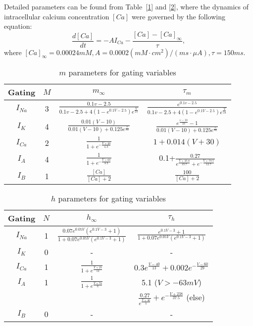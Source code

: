 \documentclass[12pt, a4paper]{article}%
\begin{document}
Detailed parameters can be found from Table~[\ref{tab:gating1}] and [\ref{tab:gating2}], where the dynamics of intracellular calcium concentration $[Ca]$ were governed by the following equation:
$$\frac{d[Ca]}{dt} = -AI_{Ca} - \frac{[Ca]-[Ca]_{\infty}}{\tau},$$
where $[Ca]_{\infty} = 0.00024 mM , A = 0.0002 (mM \cdot cm^{2}) /(ms \cdot \mu A), \tau = 150 ms.$

\begin{table}[htop]
\centering
\caption[gating]{$m$ parameters for gating variables} \label{tab:gating1}
\begin{tabular}{c|c|c|c}
\hline
Gating   & $M$ & $m_{\infty}$                      & $\tau_{m}$           \\\hline
$I_{Na}$  & 3 & $\frac{0.1v-2.5}{0.1v-2.5+4(1-e^{0.1V-2.5})e^{\frac{V}{18}}}$ & $\frac{e^{0.1v-2.5}}{0.1v-2.5+4(1-e^{0.1V-2.5})e^{\frac{V}{18}}}$ \\
$I_{K}$   & 4 & $\frac{0.01(V-10)}{0.01(V-10)+0.125e^{\frac{v}{80}}}$ & $\frac{e^{\frac{v-10}{10}}-1}{0.01(V-10)+0.125e^{\frac{v}{80}}}$ \\
$I_{Ca}$  & 2 & $\frac{1}{1+e^{-\frac{V+20}{6.5}}}$ & $1+0.014(V+30)$        \\  %
$I_{A}$   & 4 & $\frac{1}{1+e^{-\frac{V+60}{8.5}}}$ & 0.1+$\frac{0.27}{ e^{\frac{V + 35.8}{19.7}} + e^{-\frac{V + 79.7}{12.7}}}$ \\
$I_{B}$  &  1 &  $\frac{[Ca]}{[Ca]+2}$           & $\frac{100}{[Ca]+2}$  \\\hline
\end{tabular}
\end{table}

\begin{table}[htop]
\centering
\caption[gating]{$h$ parameters for gating variables} \label{tab:gating2}
\begin{tabular}{c|c|c|c}
\hline
Gating   & $N$ & $h_{\infty}$                   & $\tau_{h}$ \\\hline
$I_{Na}$  & 1 & $\frac{0.07e^{0.05V}(e^{0.1V-3}+1)}{1+0.07e^{0.05V}(e^{0.1V-3}+1)}$ & $\frac{e^{0.1V-3}+1}{1+0.07e^{0.05V}(e^{0.1V-3}+1)}$ \\
$I_{K}$   & 0 &  -                            & - \\
$I_{Ca}$  & 1 &  $\frac{1}{1+e^{\frac{V+25}{12}}}$ & $0.3e^{\frac{V-40}{13}} + 0.002e^{-\frac{V-60}{29}}$ \\  %
$I_{A}$   & 1 &  $\frac{1}{1+e^{\frac{V+78}{6}}}$ &  5.1 ($V> -63mV$) \\
         &   &                                & $\frac{0.27}{e^{\frac{V+46}{5}}} +e^{-\frac{V+238}{37.5}}$ (else) \\
$I_{B}$  & 0  &  -                            & - \\\hline
\end{tabular}
\end{table}
\end{document}
